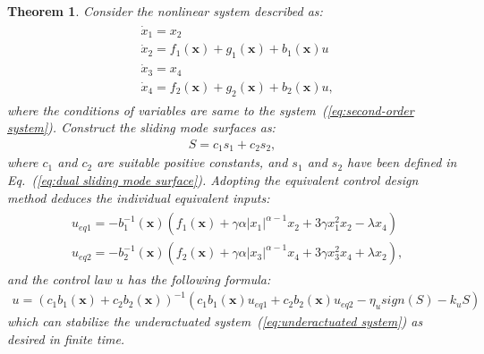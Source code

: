 \documentclass[3p]{elsarticle}
\theoremstyle{plain}
\newtheorem{mythm}{Theorem}
\theoremstyle{remark}
\begin{document}
\begin{mythm}
Consider the nonlinear system described as:
\begin{align}
\begin{split}
&\dot x_1 = x_2\\
&\dot x_2 = f_1(\bm x) + g_1(\bm x)+b_1(\bm x)u\\
&\dot x_3 = x_4\\
&\dot x_4 = f_2(\bm x) + g_2(\bm x)+b_2(\bm x)u,\label{eq:underactuated system}
\end{split}
\end{align}
where the conditions of variables are same to the system~(\ref{eq:second-order system}). Construct the sliding mode  surfaces as:
\begin{align}
S = c_1s_1+c_2s_2,
\end{align}
where $c_1$ and $c_2$ are suitable positive constants, and $s_1$ and $s_2$ have been defined in Eq.~(\ref{eq:dual sliding mode  surface}). Adopting the equivalent control design method deduces the individual equivalent inputs:
\begin{align}
\begin{split}
&u_{eq1} = -b_1^{-1}(\bm x)(f_1(\bm x)+\gamma\alpha\vert x_1\vert^{\alpha-1}x_2+3\gamma x_1^2x_2-\lambda x_4)\\
&u_{eq2} = -b_2^{-1}(\bm x)(f_2(\bm x)+\gamma\alpha\vert x_3\vert^{\alpha-1}x_4+3\gamma x_3^2x_4+\lambda x_2),
\end{split}
\end{align}
and the control law $u$ has the following formula:
\begin{align}
u = (c_1b_1(\bm x)+c_2b_2(\bm x))^{-1}(c_1b_1(\bm x)u_{eq1}+c_2b_2(\bm x)u_{eq2}-\eta_u sign(S)-k_u S)\label{eq:underactuated input}
\end{align}
which can stabilize the underactuated system~(\ref{eq:underactuated system}) as desired in finite time.
\end{mythm}
\end{document}
